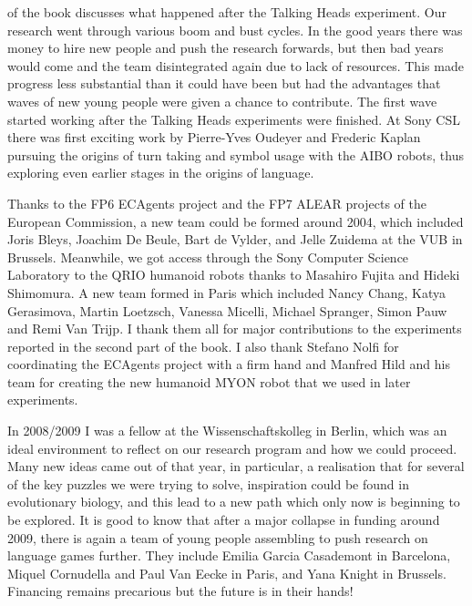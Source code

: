  of the book discusses what happened after the Talking Heads experiment. Our research went through various 
boom and bust cycles. In the good years there was money to hire new people and push the research forwards, but then 
bad years would come and the team disintegrated again due to lack of resources. This made progress less substantial than it
could have been but had the advantages that waves of new young people were given a chance to contribute. The first wave 
started working after the Talking Heads experiments were finished. At Sony CSL there was first exciting work by Pierre-Yves Oudeyer 
and Frederic Kaplan pursuing the origins of turn taking and symbol usage with the AIBO robots, thus exploring even earlier 
stages in the origins of language. 

Thanks to the FP6 ECAgents project and the FP7 ALEAR projects of the European Commission, a new 
team could be formed around 2004, which included Joris Bleys, Joachim De Beule, Bart de Vylder, and Jelle Zuidema at the 
VUB in Brussels. Meanwhile, we got access through the Sony Computer Science Laboratory to the QRIO humanoid robots 
thanks to Masahiro Fujita and Hideki Shimomura. A new team formed in Paris which included Nancy Chang, Katya Gerasimova, Martin Loetzsch, 
Vanessa Micelli, Michael Spranger, Simon Pauw and Remi Van Trijp. I thank them all for major contributions to the experiments reported 
in the second part of the book. I also thank Stefano Nolfi for coordinating the ECAgents project with a firm hand 
and Manfred Hild and his team for creating the new humanoid MYON robot that we used in later experiments. 

In 2008/2009 I was a fellow at the Wissenschaftskolleg in Berlin, which was an ideal environment to reflect on our research 
program and how we could proceed. Many new ideas came out of that year, in particular, a realisation that for several of the key
puzzles we were trying to solve, inspiration could be found in evolutionary biology, and this lead to a new path which only now 
is beginning to be explored. It is good to know that after a major collapse in funding around 2009, there is 
again a team of young people assembling to push research on language games further. They include Emilia Garcia Casademont in 
Barcelona, Miquel Cornudella and Paul Van Eecke in Paris, and Yana Knight in Brussels. Financing remains precarious 
but the future is in their hands! 


